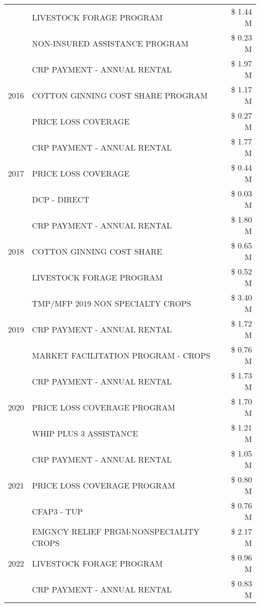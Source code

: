 \begin{tabular}{llr}
 & LIVESTOCK FORAGE PROGRAM & \$ 1.44 M \\
 & NON-INSURED ASSISTANCE PROGRAM & \$ 0.23 M \\
\cline{1-3}
\multirow[t]{3}{*}{2016} & CRP PAYMENT - ANNUAL RENTAL & \$ 1.97 M \\
 & COTTON GINNING COST SHARE PROGRAM & \$ 1.17 M \\
 & PRICE LOSS COVERAGE & \$ 0.27 M \\
\cline{1-3}
\multirow[t]{3}{*}{2017} & CRP PAYMENT - ANNUAL RENTAL & \$ 1.77 M \\
 & PRICE LOSS COVERAGE & \$ 0.44 M \\
 & DCP - DIRECT & \$ 0.03 M \\
\cline{1-3}
\multirow[t]{3}{*}{2018} & CRP PAYMENT - ANNUAL RENTAL & \$ 1.80 M \\
 & COTTON GINNING COST SHARE & \$ 0.65 M \\
 & LIVESTOCK FORAGE PROGRAM & \$ 0.52 M \\
\cline{1-3}
\multirow[t]{3}{*}{2019} & TMP/MFP 2019 NON SPECIALTY CROPS & \$ 3.40 M \\
 & CRP PAYMENT - ANNUAL RENTAL & \$ 1.72 M \\
 & MARKET FACILITATION PROGRAM - CROPS & \$ 0.76 M \\
\cline{1-3}
\multirow[t]{3}{*}{2020} & CRP PAYMENT - ANNUAL RENTAL & \$ 1.73 M \\
 & PRICE LOSS COVERAGE PROGRAM & \$ 1.70 M \\
 & WHIP PLUS 3 ASSISTANCE & \$ 1.21 M \\
\cline{1-3}
\multirow[t]{3}{*}{2021} & CRP PAYMENT - ANNUAL RENTAL & \$ 1.05 M \\
 & PRICE LOSS COVERAGE PROGRAM & \$ 0.80 M \\
 & CFAP3 - TUP & \$ 0.76 M \\
\cline{1-3}
\multirow[t]{3}{*}{2022} & EMGNCY RELIEF PRGM-NONSPECIALITY CROPS & \$ 2.17 M \\
 & LIVESTOCK FORAGE PROGRAM & \$ 0.96 M \\
 & CRP PAYMENT - ANNUAL RENTAL & \$ 0.83 M \\
\cline{1-3}
\bottomrule
\end{tabular}
